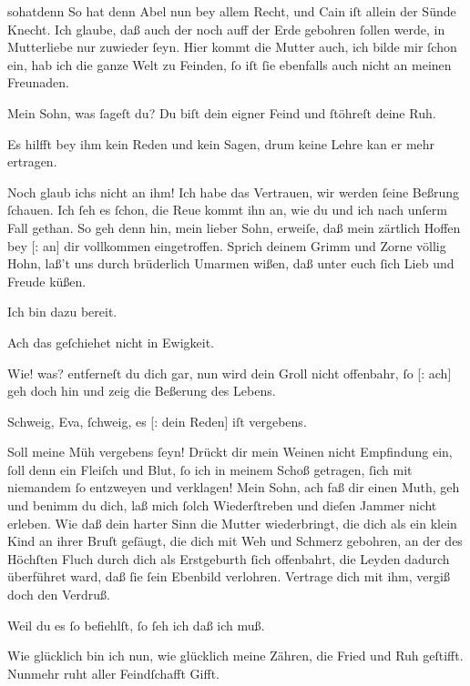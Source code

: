 \documentclass[tocstyle=ref-genre]{ees}
\begin{document}
{\begin{movement}{sohatdenn}
  \voice[Cain]
  So hat denn Abel nun bey allem Recht,
  und Cain iſt allein der Sünde Knecht.
  Ich glaube, daß auch der noch auff der Erde
  gebohren ſollen werde,
  in Mutterliebe nur zuwieder ſeyn.
  Hier kommt die Mutter auch, ich bilde mir ſchon ein,
  hab ich die ganze Welt zu Feinden,
  ſo iſt ſie ebenfalls auch nicht an meinen Freunaden.

  \voice[Eva]
  Mein Sohn, was ſageſt du?
  Du biſt dein eigner Feind und ſtöhreſt deine Ruh.

  \voice[Adam]
  Es hilfft bey ihm kein Reden und kein Sagen,
  drum keine Lehre kan er mehr ertragen.

  \voice[Eva]
  Noch glaub ichs nicht an ihm! Ich habe das Vertrauen,
  wir werden ſeine Beßrung ſchauen.
  Ich ſeh es ſchon, die Reue kommt ihn an,
  wie du und ich nach unſerm Fall gethan.
  So geh denn hin, mein lieber Sohn,
  erweiſe, daß mein zärtlich Hoffen
  bey [: an] dir vollkommen eingetroffen.
  Sprich deinem Grimm und Zorne völlig Hohn,
  laß't uns durch brüderlich Umarmen wißen,
  daß unter euch ſich Lieb und Freude küßen.

  \voice[Abel]
  Ich bin dazu bereit.

  \voice[Cain]
  Ach das geſchiehet nicht in Ewigkeit.

  \voice[Eva]
  Wie! was? entferneſt du dich gar,
  nun wird dein Groll nicht offenbahr,
  ſo [: ach] geh doch hin und zeig die Beßerung des Lebens.

  \voice[Cain]
  Schweig, Eva, ſchweig, es [: dein Reden] iſt vergebens.

  \voice[Eva]
  Soll meine Müh vergebens ſeyn!
  Drückt dir mein Weinen nicht Empfindung ein,
  ſoll denn ein Fleiſch und Blut,
  ſo ich in meinem Schoß getragen,
  ſich mit niemandem ſo entzweyen und verklagen!
  Mein Sohn, ach faß dir einen Muth,
  geh und benimm du dich, laß mich ſolch Wiederſtreben
  und dieſen Jammer nicht erleben.
  Wie daß dein harter Sinn die Mutter wiederbringt,
  die dich als ein klein Kind an ihrer Bruſt geſäugt,
  die dich mit Weh und Schmerz gebohren,
  an der des Höchſten Fluch
  durch dich als Erstgeburth ſich offenbahrt,
  die Leyden dadurch überführet ward,
  daß ſie ſein Ebenbild verlohren.
  Vertrage dich mit ihm, vergiß doch den Verdruß.

  \voice[Cain]
  Weil du es ſo befiehlſt, ſo ſeh ich daß ich muß.

  \voice[Eva]
  Wie glücklich bin ich nun, wie glücklich meine Zähren,
  die Fried und Ruh geſtifft.
  Nunmehr ruht aller Feindſchafft Gifft.


\end{movement}}
\end{document}
